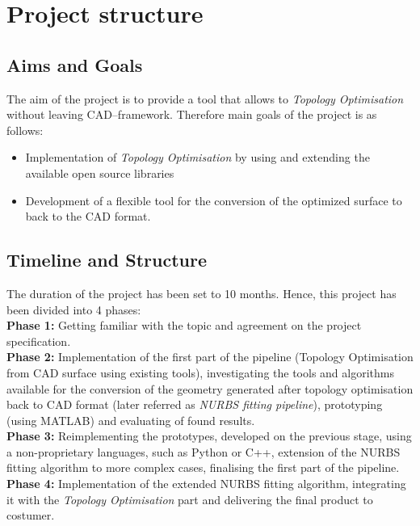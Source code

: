 \section{Project structure}
\subsection{Aims and Goals}
The aim of the project is to provide a tool that allows to \textit{Topology Optimisation} without leaving CAD--framework. Therefore main goals of the project is as follows:
\begin{itemize}
\item Implementation of \textit{Topology Optimisation} by using and extending the available open source libraries
\item Development of a flexible tool for the conversion of the optimized surface to back to the CAD format.
\end{itemize}
\subsection{Timeline and Structure}
The duration of the project has been set to 10 months. Hence, this project has been divided into 4 phases:\\

\textbf{Phase 1:} Getting familiar with the topic and agreement on the project specification.\\

\textbf{Phase 2:} Implementation of the first part of the pipeline (Topology Optimisation from CAD surface using existing tools), investigating the tools and algorithms available for the conversion of the geometry generated after topology optimisation back to CAD format (later referred as \textit{NURBS fitting pipeline}), prototyping (using MATLAB) and evaluating of found results.\\

\textbf{Phase 3:} Reimplementing the prototypes, developed on the previous stage, using a non-proprietary languages, such as Python or C++, extension of the NURBS fitting algorithm to more complex cases, finalising the first part of the pipeline.\\

\textbf{Phase 4:} Implementation of the extended NURBS fitting algorithm, integrating it with the \textit{Topology Optimisation} part and delivering the final product to costumer.

